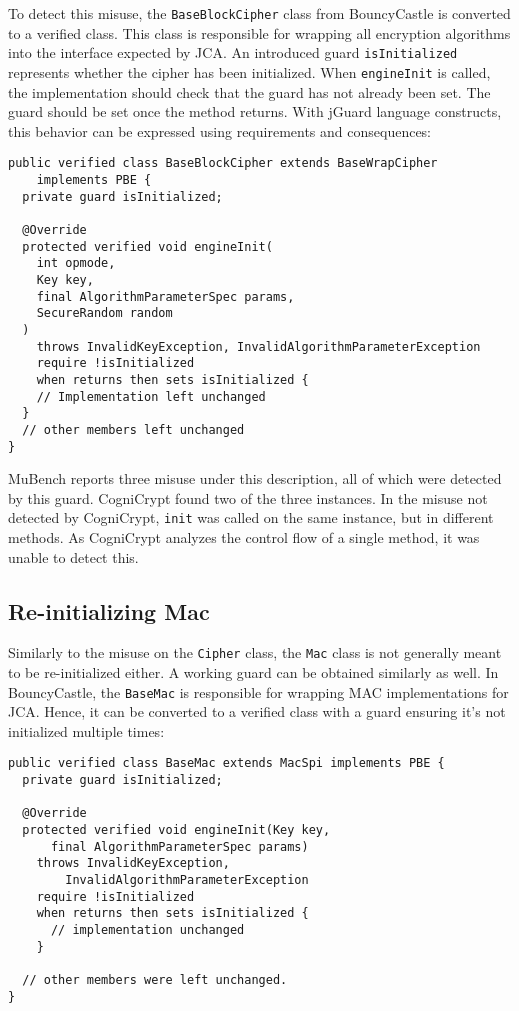 \documentclass{article}
\begin{document}
To detect this misuse, the \texttt{BaseBlockCipher} class from BouncyCastle is converted to a verified
class. This class is responsible for wrapping all encryption algorithms into the interface
expected by JCA.
An introduced guard \texttt{isInitialized} represents whether the cipher has been initialized.
When \texttt{engineInit} is called, the implementation should check that the guard has not already been
set. The guard should be set once the method returns.
With jGuard language constructs, this behavior can be expressed using requirements and consequences:

\begin{lstlisting}[style=jGuard]
public verified class BaseBlockCipher extends BaseWrapCipher 
    implements PBE {
  private guard isInitialized;

  @Override
  protected verified void engineInit(
    int opmode,
    Key key,
    final AlgorithmParameterSpec params,
    SecureRandom random
  )
    throws InvalidKeyException, InvalidAlgorithmParameterException
    require !isInitialized
    when returns then sets isInitialized {
    // Implementation left unchanged
  }
  // other members left unchanged
}
\end{lstlisting}

MuBench reports three misuse under this description, all of which were detected
by this guard.
CogniCrypt found two of the three instances.
In the misuse not detected by CogniCrypt, \texttt{init} was called on the same instance,
but in different methods. As CogniCrypt analyzes the control flow of a single method, it
was unable to detect this.

\subsection{Re-initializing Mac}

Similarly to the misuse on the \texttt{Cipher} class, the \texttt{Mac} class is not generally meant to
be re-initialized either.
A working guard can be obtained similarly as well. In BouncyCastle, the \texttt{BaseMac} is responsible
for wrapping MAC implementations for JCA.
Hence, it can be converted to a verified class with a guard ensuring it's not initialized multiple
times:

\begin{lstlisting}[style=jGuard]
public verified class BaseMac extends MacSpi implements PBE {
  private guard isInitialized;

  @Override
  protected verified void engineInit(Key key, 
      final AlgorithmParameterSpec params)
    throws InvalidKeyException,
        InvalidAlgorithmParameterException
    require !isInitialized
    when returns then sets isInitialized {
      // implementation unchanged
    }

  // other members were left unchanged.
}
\end{lstlisting}
\end{document}
